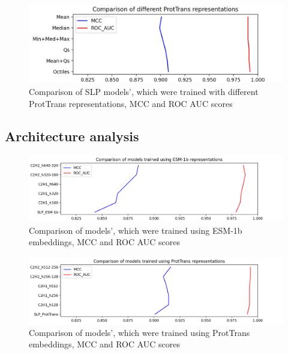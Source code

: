 \documentclass[12pt]{article}
\begin{document}
	\begin{figure}[h!]
		\centering
		\includegraphics[scale=0.7]{SLP_PT_003_diff_representations.png}

		\caption{Comparison of SLP models', which were trained with different
		ProtTrans representations, MCC and ROC AUC scores}
		\label{figure:scoresRepresentationsPT}
	\end{figure}

	\newpage

	\subsection{Architecture analysis}

	\begin{figure}[h!]
		\centering
		\includegraphics[scale=0.6]{MLP_ESM.png}

		\caption{Comparison of models', which were trained using 
		ESM-1b embeddings, MCC and ROC AUC scores}
		\label{figure:scoresMLP_ESM}
	\end{figure}

	\begin{figure}[h!]
		\centering
		\includegraphics[scale=0.6]{MLP_PT.png}

		\caption{Comparison of models', which were trained using 
		ProtTrans embeddings, MCC and ROC AUC scores}
		\label{figure:scoresMLP_PT}
	\end{figure}
\end{document}
